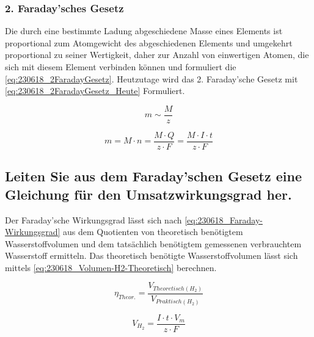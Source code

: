 \subsubsection{2. Faraday'sches Gesetz}

Die durch eine bestimmte Ladung abgeschiedene Masse eines Elements ist proportional zum Atomgewicht des abgeschiedenen Elements und umgekehrt proportional zu seiner Wertigkeit, daher zur Anzahl von einwertigen Atomen, die sich mit diesem Element verbinden können \cite{Faraday_G} und formuliert die \autoref{eq:230618_2FaradayGesetz}.
Heutzutage wird das 2. Faraday'sche Gesetz mit \autoref{eq:230618_2FaradayGesetz_Heute} Formuliert.

\begin{equation}
    m \sim \frac{M}{z}
    \label{eq:230618_2FaradayGesetz}
\end{equation}

\begin{equation}
    m = M \cdot n = \frac{M \cdot Q}{z \cdot F} = \frac{M \cdot I \cdot t}{z \cdot F}
    \label{eq:230618_2FaradayGesetz_Heute}
\end{equation}

\subsection{Leiten Sie aus dem Faraday'schen Gesetz eine Gleichung für den Umsatzwirkungsgrad her.}

Der Faraday'sche Wirkungsgrad lässt sich nach \autoref{eq:230618_Faraday-Wirkungsgrad} aus dem Quotienten von theoretisch benötigtem Wasserstoffvolumen und dem tatsächlich benötigtem gemessenen verbrauchtem Wasserstoff ermitteln.
Das theoretisch benötigte Wasserstoffvolumen lässt sich mittels \autoref{eq:230618_Volumen-H2-Theoretisch} berechnen.

\begin{equation}
    \eta_{Theor.} = \frac{V_{Theoretisch(H_2)}}{V_{Praktisch(H_2)}}
    \label{eq:230618_Faraday-Wirkungsgrad}
\end{equation}

\begin{equation}
    V_{H_2} = \frac{I \cdot t \cdot V_m}{z \cdot F}
    \label{eq:230618_Volumen-H2-Theoretisch}
\end{equation}